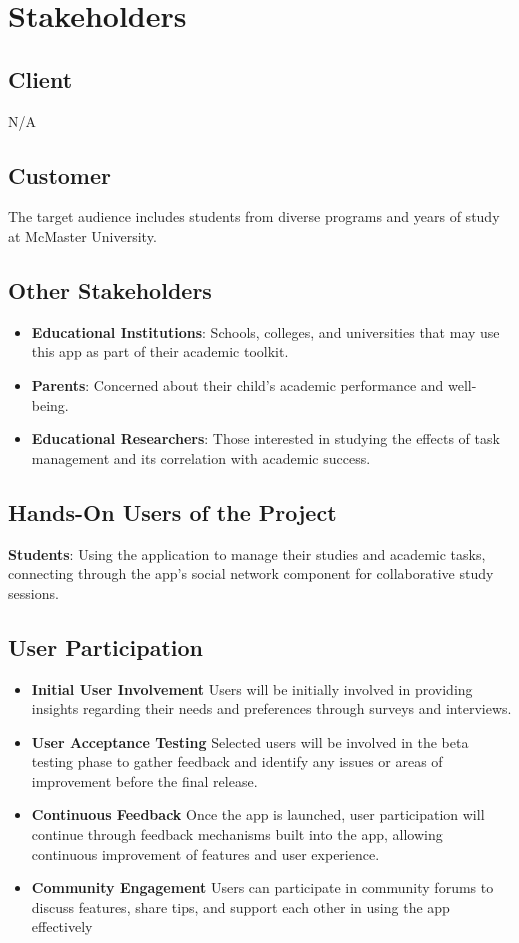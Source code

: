 \documentclass[12pt]{article}
\begin{document}
\section{Stakeholders}
\subsection{Client}
N/A
\subsection{Customer}
The target audience includes students from diverse programs and years of study at McMaster University.
\subsection{Other Stakeholders}
\begin{itemize}
  \item \textbf{Educational Institutions}: Schools, colleges, and universities that may use this app as part of their academic toolkit.
  \item \textbf{Parents}: Concerned about their child's academic performance and well-being.
  \item \textbf{Educational Researchers}: Those interested in studying the effects of task management and its correlation with academic success.
\end{itemize}

\subsection{Hands-On Users of the Project}
\textbf{Students}: Using the application to manage their studies and academic tasks, connecting through the app's social network component for collaborative study sessions.
\subsection{User Participation}
\begin{itemize}
  \item \textbf{Initial User Involvement}
  Users will be initially involved in providing insights regarding their needs and preferences through surveys and interviews. 
  \item \textbf{User Acceptance Testing}
  Selected users will be involved in the beta testing phase to gather feedback and identify any issues or areas of improvement before the final release.
  \item \textbf{Continuous Feedback}
  Once the app is launched, user participation will continue through feedback mechanisms built into the app, allowing continuous improvement of features and user experience.
  \item \textbf{Community Engagement}
  Users can participate in community forums to discuss features, share tips, and support each other in using the app effectively
\end{itemize}
\end{document}
